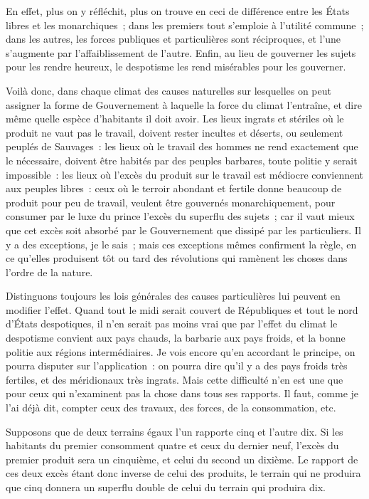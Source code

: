 \documentclass[french,twoside]{book} %
\begin{document}
En effet, plus on y réfléchit, plus on trouve en ceci de différence entre les États libres et les monarchiques ; dans les premiers tout s’emploie à l’utilité commune ; dans les autres, les forces publiques et particulières sont réciproques, et l’une s’augmente par l’affaiblissement de l’autre. Enfin, au lieu de gouverner les sujets pour les rendre heureux, le despotisme les rend misérables pour les gouverner.\par
Voilà donc, dans chaque climat des causes naturelles sur lesquelles on peut assigner la forme de Gouvernement à laquelle la force du climat l’entraîne, et dire même quelle espèce d’habitants il doit avoir. Les lieux ingrats et stériles où le produit ne vaut pas le travail, doivent rester incultes et déserts, ou seulement peuplés de Sauvages : les lieux où le travail des hommes ne rend exactement que le nécessaire, doivent être habités par des peuples barbares, toute politie y serait impossible : les lieux où l’excès du produit sur le travail est médiocre conviennent aux peuples libres : ceux où le terroir abondant et fertile donne beaucoup de produit pour peu de travail, veulent être gouvernés monarchiquement, pour consumer par le luxe du prince l’excès du superflu des sujets ; car il vaut mieux que cet excès soit absorbé par le Gouvernement que dissipé par les particuliers. Il y a des exceptions, je le sais ; mais ces exceptions mêmes confirment la règle, en ce qu’elles produisent tôt ou tard des révolutions qui ramènent les choses dans l’ordre de la nature.\par
Distinguons toujours les lois générales des causes particulières lui peuvent en modifier l’effet. Quand tout le midi serait couvert de Républiques et tout le nord d’États despotiques, il n’en serait pas moins vrai que par l’effet du climat le despotisme convient aux pays chauds, la barbarie aux pays froids, et la bonne politie aux régions intermédiaires. Je vois encore qu’en accordant le principe, on pourra disputer sur l’application : on pourra dire qu’il y a des pays froids très fertiles, et des méridionaux très ingrats. Mais cette difficulté n’en est une que pour ceux qui n’examinent pas la chose dans tous ses rapports. Il faut, comme je l’ai déjà dit, compter ceux des travaux, des forces, de la consommation, etc.\par
Supposons que de deux terrains égaux l’un rapporte cinq et l’autre dix. Si les habitants du premier consomment quatre et ceux du dernier neuf, l’excès du premier produit sera un cinquième, et celui du second un dixième. Le rapport de ces deux excès étant donc inverse de celui des produits, le terrain qui ne produira que cinq donnera un superflu double de celui du terrain qui produira dix.\par
\end{document}
